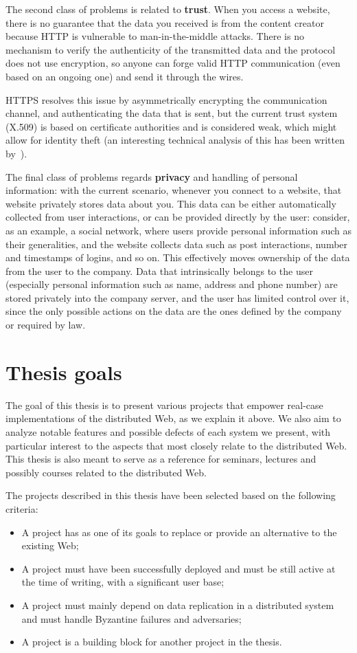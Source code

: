 \documentclass[mscthesis]{usiinfthesis}
\begin{document}
The second class of problems is related to \textbf{trust}. When you access a website, there is no guarantee that the data you received is from the content creator because HTTP is vulnerable to man-in-the-middle attacks. There is no mechanism to verify the authenticity of the transmitted data and the protocol does not use encryption, so anyone can forge valid HTTP communication (even based on an ongoing one) and send it through the wires.

HTTPS resolves this issue by asymmetrically encrypting the communication channel, and authenticating the data that is sent, but the current trust system (X.509) is based on certificate authorities and is considered weak, which might allow for identity theft (an interesting technical analysis of this has been written by~\cite{webarticle:httpssecurity}). %

The final class of problems regards \textbf{privacy} and handling of personal information: with the current scenario, whenever you connect to a website, that website privately stores data about you.
This data can be either automatically collected from user interactions, or can be provided directly by the user: consider, as an example, a social network, where users provide personal information such as their generalities, and the website collects data such as post interactions, number and timestamps of logins, and so on.
This effectively moves ownership of the data from the user to the company. Data that intrinsically belongs to the user (especially personal information such as name, address and phone number) are stored privately into the company server, and the user has limited control over it, since the only possible actions on the data are the ones defined by the company or required by law.

\section{Thesis goals}
The goal of this thesis is to present various projects that empower real-case implementations of the distributed Web, as we explain it above. We also aim to analyze notable features and possible defects of each system we present, with particular interest to the aspects that most closely relate to the distributed Web. This thesis is also meant to serve as a reference for seminars, lectures and possibly courses related to the distributed Web.

The projects described in this thesis have been selected based on the following criteria:
\begin{itemize}
	\item A project has as one of its goals to replace or provide an alternative to the existing Web;
	\item A project must have been successfully deployed and must be still active at the time of writing, with a significant user base;
	\item A project must mainly depend on data replication in a distributed system and must handle Byzantine failures and adversaries;
	\item A project is a building block for another project in the thesis.
\end{itemize}
\end{document}
